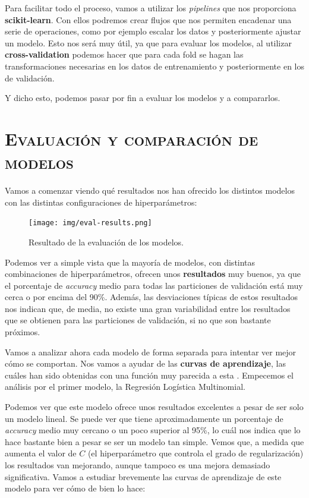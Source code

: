 \documentclass[11pt,a4paper]{article}
\begin{document}
Para facilitar todo el proceso, vamos a utilizar los \textit{pipelines} \cite{bib:pipeline} que nos proporciona \textbf{scikit-learn}. Con ellos
podremos crear flujos que nos permiten encadenar una serie de operaciones, como por ejemplo escalar los datos y posteriormente ajustar un modelo.
Esto nos será muy útil, ya que para evaluar los modelos, al utilizar \textbf{cross-validation} podemos hacer que para cada fold se hagan las
transformaciones necesarias en los datos de entrenamiento y posteriormente en los de validación.

Y dicho esto, podemos pasar por fin a evaluar los modelos y a compararlos.

\section{\textsc{Evaluación y comparación de modelos}}

Vamos a comenzar viendo qué resultados nos han ofrecido los distintos modelos con las distintas configuraciones de hiperparámetros:

\begin{figure}[H]
    \centering
    \texttt{[image: img/eval-results.png]}
    \caption{Resultado de la evaluación de los modelos.}
    \label{fig:eval-results}
\end{figure}

Podemos ver a simple vista que la mayoría de modelos, con distintas combinaciones de hiperparámetros, ofrecen unos \textbf{resultados} muy buenos, ya que el
porcentaje de \textit{accuracy} medio para todas las particiones de validación está muy cerca o por encima del 90\%. Además, las desviaciones
típicas de estos resultados nos indican que, de media, no existe una gran variabilidad entre los resultados que se obtienen para las particiones
de validación, si no que son bastante próximos.

Vamos a analizar ahora cada modelo de forma separada para intentar ver mejor cómo se comportan. Nos vamos a ayudar de las \textbf{curvas de aprendizaje},
las cuáles han sido obtenidas con una función muy parecida a esta \cite{bib:learning_curve}. Empecemos el análisis por el primer modelo, la
Regresión Logística Multinomial.

Podemos ver que este modelo ofrece unos resultados excelentes a pesar de ser solo un modelo lineal. Se puede ver que tiene aproximadamente
un porcentaje de \textit{accuracy} medio muy cercano o un poco superior al 95\%, lo cuál nos indica que lo hace bastante bien a pesar se ser
un modelo tan simple. Vemos que, a medida que aumenta el valor de $C$ (el hiperparámetro que controla el grado de regularización) los resultados
van mejorando, aunque tampoco es una mejora demasiado significativa. Vamos a estudiar brevemente las curvas de aprendizaje de este modelo para
ver cómo de bien lo hace:
\end{document}
